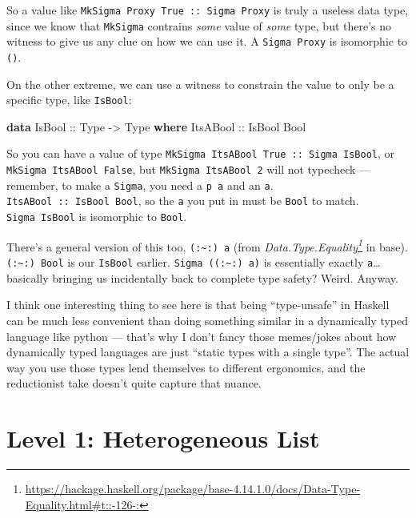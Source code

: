 \documentclass[]{article}
\newenvironment{Shaded}{}{}
\newcommand{\DataTypeTok}[1]{\textcolor[rgb]{0.56,0.13,0.00}{#1}}
\newcommand{\KeywordTok}[1]{\textcolor[rgb]{0.00,0.44,0.13}{\textbf{#1}}}
\newcommand{\OtherTok}[1]{\textcolor[rgb]{0.00,0.44,0.13}{#1}}
\renewcommand{\href}[2]{#2\footnote{\url{#1}}}
\begin{document}
So a value like \texttt{MkSigma\ Proxy\ True\ ::\ Sigma\ Proxy} is truly a
useless data type, since we know that \texttt{MkSigma} contrains \emph{some}
value of \emph{some} type, but there's no witness to give us any clue on how we
can use it. A \texttt{Sigma\ Proxy} is isomorphic to \texttt{()}.

On the other extreme, we can use a witness to constrain the value to only be a
specific type, like \texttt{IsBool}:

\begin{Shaded}
\begin{Highlighting}[]
\KeywordTok{data} \DataTypeTok{IsBool}\OtherTok{ ::} \DataTypeTok{Type} \OtherTok{{-}\textgreater{}} \DataTypeTok{Type} \KeywordTok{where}
    \DataTypeTok{ItsABool}\OtherTok{ ::} \DataTypeTok{IsBool} \DataTypeTok{Bool}
\end{Highlighting}
\end{Shaded}

So you can have a value of type
\texttt{MkSigma\ ItsABool\ True\ ::\ Sigma\ IsBool}, or
\texttt{MkSigma\ ItsABool\ False}, but \texttt{MkSigma\ ItsABool\ 2} will not
typecheck --- remember, to make a \texttt{Sigma}, you need a \texttt{p\ a} and
an \texttt{a}. \texttt{ItsABool\ ::\ IsBool\ Bool}, so the \texttt{a} you put in
must be \texttt{Bool} to match. \texttt{Sigma\ IsBool} is isomorphic to
\texttt{Bool}.

There's a general version of this too, \texttt{(:\textasciitilde{}:)\ a} (from
\emph{\href{https://hackage.haskell.org/package/base-4.14.1.0/docs/Data-Type-Equality.html\#t::-126-:}{Data.Type.Equality}}
in base). \texttt{(:\textasciitilde{}:)\ Bool} is our \texttt{IsBool} earlier.
\texttt{Sigma\ ((:\textasciitilde{}:)\ a)} is essentially exactly
\texttt{a}\ldots basically bringing us incidentally back to complete type
safety? Weird. Anyway.

I think one interesting thing to see here is that being ``type-unsafe'' in
Haskell can be much less convenient than doing something similar in a
dynamically typed language like python --- that's why I don't fancy those
memes/jokes about how dynamically typed languages are just ``static types with a
single type''. The actual way you use those types lend themselves to different
ergonomics, and the reductionist take doesn't quite capture that nuance.

\section{Level 1: Heterogeneous List}\label{level-1-heterogeneous-list}
\end{document}
